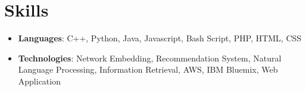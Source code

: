 \documentclass[letterpaper,11pt]{article}
\newcommand{\resumeSubHeadingListStart}{\begin{itemize}[label={},leftmargin=*]}
\newcommand{\resumeSubHeadingListEnd}{\end{itemize}}
\begin{document}
\section{Skills}
  \resumeSubHeadingListStart
    \item{
      \textbf{Languages}{: C++, Python, Java, Javascript, Bash Script, PHP, HTML, CSS}
	}
	\item{
      \textbf{Technologies}{:  Network Embedding, Recommendation System, Natural Language Processing, Information Retrieval, AWS, IBM Bluemix, Web Application}
    }
  \resumeSubHeadingListEnd


\end{document}
